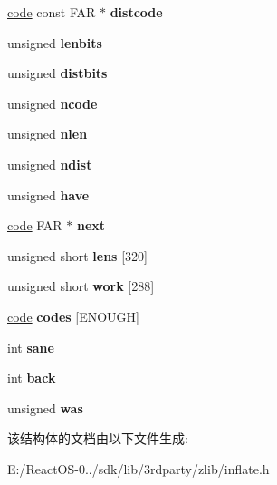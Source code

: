 \begin{DoxyCompactItemize}
\hyperlink{structcode}{code} const F\+AR $\ast$ {\bfseries distcode}
\item 
\mbox{\label{structinflate__state_a3ff97e6b230d7551fc848ff9de0236e9}} 
unsigned {\bfseries lenbits}
\item 
\mbox{\label{structinflate__state_a98952f3f8f420a05b567f080aca0eb4b}} 
unsigned {\bfseries distbits}
\item 
\mbox{\label{structinflate__state_a62b5ea8559856b315b6c89d9114c2109}} 
unsigned {\bfseries ncode}
\item 
\mbox{\label{structinflate__state_a489b005f4fe214353cd80b77b4f23194}} 
unsigned {\bfseries nlen}
\item 
\mbox{\label{structinflate__state_a4415e5e51efdd0c8672e4c601caa4762}} 
unsigned {\bfseries ndist}
\item 
\mbox{\label{structinflate__state_a4a2b15912256bcf7b39980e15095ba58}} 
unsigned {\bfseries have}
\item 
\mbox{\label{structinflate__state_a872bf267d91efb4143e9cfb812e670bb}} 
\hyperlink{structcode}{code} F\+AR $\ast$ {\bfseries next}
\item 
\mbox{\label{structinflate__state_aa0620e64487c48635f6c3a11a0aeb99d}} 
unsigned short {\bfseries lens} \mbox{[}320\mbox{]}
\item 
\mbox{\label{structinflate__state_a85403907f7f5b9d355821ffa2591456c}} 
unsigned short {\bfseries work} \mbox{[}288\mbox{]}
\item 
\mbox{\label{structinflate__state_af9581f523a7d8d47fba6cdd73eaf1edc}} 
\hyperlink{structcode}{code} {\bfseries codes} \mbox{[}E\+N\+O\+U\+GH\mbox{]}
\item 
\mbox{\label{structinflate__state_a98b40fe23b7177bc8cd1d9d73edad593}} 
int {\bfseries sane}
\item 
\mbox{\label{structinflate__state_ab666ce74a806fc77200ced9bc385cb0b}} 
int {\bfseries back}
\item 
\mbox{\label{structinflate__state_a0e3af9175f6d3b30f83af69062ba4dec}} 
unsigned {\bfseries was}
\end{DoxyCompactItemize}


该结构体的文档由以下文件生成\+:\begin{DoxyCompactItemize}
\item 
E\+:/\+React\+O\+S-\/0../sdk/lib/3rdparty/zlib/inflate.\+h\end{DoxyCompactItemize}
